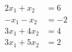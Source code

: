 \begin{align*}
 2x_1 + x_2 &= 6 \\
 -x_1 - x_2 &= -2 \\
 3x_1 + 4x_2 &= 4 \\
 3x_1 + 5x_2 &= 2
\end{align*}
